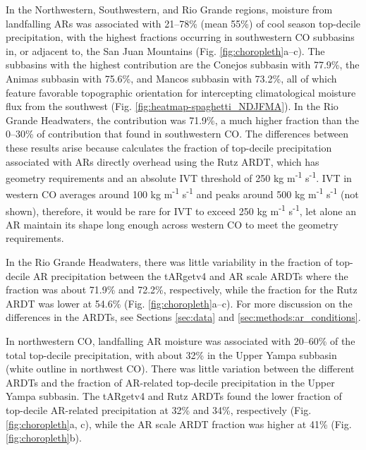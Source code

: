 \documentclass[draft]{agujournal2019}
\begin{document}
In the Northwestern, Southwestern, and Rio Grande regions, moisture from landfalling ARs was associated with 21--78\% (mean 55\%) of cool season top-decile precipitation, with the highest fractions occurring in southwestern CO subbasins in, or adjacent to, the San Juan Mountains (Fig. \ref{fig:choropleth}a--c). The subbasins with the highest contribution are the Conejos subbasin with 77.9\%, the Animas subbasin with 75.6\%, and Mancos subbasin with 73.2\%, all of which feature favorable topographic orientation for intercepting climatological moisture flux from the southwest (Fig. \ref{fig:heatmap-spaghetti_NDJFMA}). In the Rio Grande Headwaters, the contribution was 71.9\%, a much higher fraction than the 0--30\% of contribution that  found in southwestern CO. The differences between these results arise because  calculates the fraction of top-decile precipitation associated with ARs directly overhead using the Rutz ARDT, which has geometry requirements and an absolute IVT threshold of 250 kg m\textsuperscript{-1} s\textsuperscript{-1}. IVT in western CO averages around 100 kg m\textsuperscript{-1} s\textsuperscript{-1} and peaks around 500 kg m\textsuperscript{-1} s\textsuperscript{-1} (not shown), therefore, it would be rare for IVT to exceed 250 kg m\textsuperscript{-1} s\textsuperscript{-1}, let alone an AR maintain its shape long enough across western CO to meet the geometry requirements.

In the Rio Grande Headwaters, there was little variability in the fraction of top-decile AR precipitation between the tARgetv4 and AR scale ARDTs where the fraction was about 71.9\% and 72.2\%, respectively, while the fraction for the Rutz ARDT was lower at 54.6\% (Fig. \ref{fig:choropleth}a--c). For more discussion on the differences in the ARDTs, see Sections \ref{sec:data} and \ref{sec:methods:ar_conditions}. 

In northwestern CO, landfalling AR moisture was associated with 20--60\% of the total top-decile precipitation, with about 32\% in the Upper Yampa subbasin (white outline in northwest CO). There was little variation between the different ARDTs and the fraction of AR-related top-decile precipitation in the Upper Yampa subbasin. The tARgetv4 and Rutz ARDTs found the lower fraction of top-decile AR-related precipitation at 32\% and 34\%, respectively (Fig. \ref{fig:choropleth}a, c), while the AR scale ARDT fraction was higher at 41\% (Fig. \ref{fig:choropleth}b). 
\end{document}

